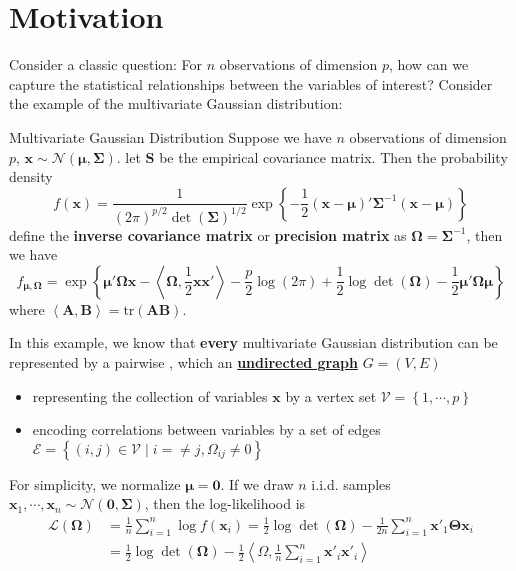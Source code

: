 \documentclass[twoside]{article}
\begin{document}

\section{Motivation}
Consider a classic question: For $n$ observations of dimension $p$, how can we capture the statistical relationships between the variables of interest? Consider the example of the multivariate Gaussian distribution:
\begin{example}{Multivariate Gaussian Distribution}{}
    Suppose we have $n$ observations of dimension $p$, $\mathbf{x}\sim \mathcal{N}(\boldsymbol{\mu},\boldsymbol{\Sigma})$. let $\mathbf{S}$ be the empirical covariance matrix. Then the probability density 
    $$
    f(\mathbf{x}) = \frac{1}{(2\pi)^{p/2}\det (\boldsymbol{\Sigma})^{1/2}}\exp\left\{ -\frac{1}{2}(\mathbf{x}-\boldsymbol{\mu})'\boldsymbol{\Sigma}^{-1}(\mathbf{x}-\boldsymbol{\mu}) \right\}
    $$
    define the \textbf{inverse covariance matrix} or \textbf{precision matrix} as $ \boldsymbol{\Omega}=\boldsymbol{\Sigma}^{-1} $, then we have 
    $$
    f_{\mathbf{\mu},\boldsymbol{\Omega}} = \exp \left\{ \boldsymbol{\mu'\Omega x} - \left< \boldsymbol{\Omega},\frac{1}{2}\mathbf{xx}' \right> -\frac{p}{2}\log(2\pi) + \frac{1}{2} \log\det(\boldsymbol{\Omega}) - \frac{1}{2}\boldsymbol{\mu'\Omega\mu} \right\}
    $$
    where $\left< \mathbf{A},\mathbf{B} \right> = \mathrm{tr}(\mathbf{AB})$.
\end{example}
In this example, we know that \textbf{every} multivariate Gaussian distribution can be represented by a pairwise , which an \textbf{\underline{undirected graph}} $G=(V,E)$
\begin{itemize}
    \item representing the collection of variables $\mathbf{x}$ by a vertex set $\mathcal{V}=\left\{1,\cdots,p\right\}$
    \item encoding correlations between variables by a set of edges $\mathcal{E}=\left\{ (i,j)\in \mathcal{V}\mid i=\neq j,\Omega_{ij}\neq 0 \right\}$  
\end{itemize}

For simplicity, we normalize $\boldsymbol{\mu} = \mathbf{0}$. If we draw $n$ i.i.d. samples $\mathbf{x}_1,\cdots,\mathbf{x}_n \sim \mathcal{N}(\mathbf{0},\boldsymbol{\Sigma})$, then the log-likelihood is
\begin{align*}
    \mathcal{L}(\boldsymbol{\Omega}) &= \frac{1}{n}\sum^n_{i=1}\log f(\mathbf{x}_i) = \frac{1}{2}\log \det (\boldsymbol{\Omega}) - \frac{1}{2n}\sum^n_{i=1}\mathbf{x}'_1\boldsymbol{\Theta}\mathbf{x}_i \\
    &= \frac{1}{2}\log\det (\boldsymbol{\Omega}) - \frac{1}{2}\left< \Omega,\frac{1}{n}\sum^n_{i=1}\mathbf{x}'_i\mathbf{x}'_i \right>
\end{align*}
\end{document}
